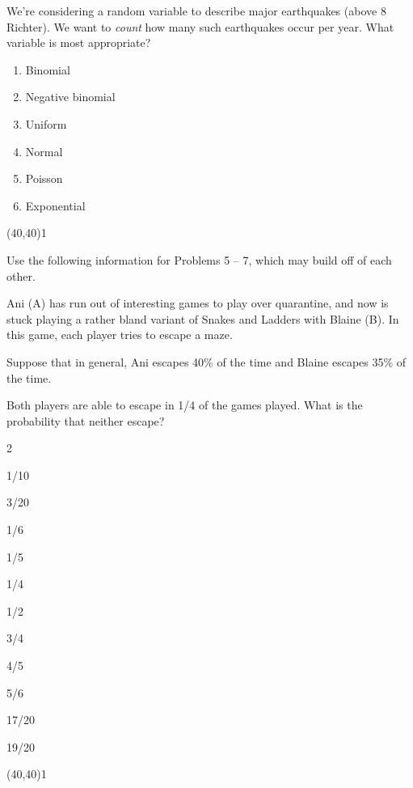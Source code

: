 \documentclass[addpoints]{exam}
\def\solutions{0}
\begin{document}
{\begin{questions}
\vspace{2mm}
\question[3] We're considering a random variable to describe major earthquakes (above 8 Richter).  We want to \textit{count} how many such earthquakes occur per year.  What variable is most appropriate?

\vspace{2mm}
\begin{minipage}[b]{.85\textwidth}
	\begin{enumerate}[label=\Alph*.]
		\item Binomial
		\item Negative binomial
		\item Uniform
		\item Normal
		\item Poisson
		\item Exponential
	\end{enumerate}
\end{minipage}
\begin{minipage}[b]{.1\textwidth}
	\vspace{\fill}\framebox(40,40){\if\solutions1 \fi}
\end{minipage}

\clearpage
\noindent Use the following information for Problems 5 -- 7, which may build off of each other.
\medskip

\noindent Ani (A) has run out of interesting games to play over quarantine, and now is stuck playing a rather bland variant of Snakes and Ladders with Blaine (B).  In this game, each player tries to escape a maze.
\vspace{1mm}

Suppose that in general, Ani escapes 40\% of the time and Blaine escapes 35\% of the time.

\question[3] Both players are able to escape in 1/4 of the games played.  What is the probability that neither escape?
\vspace{2mm}

\begin{minipage}[b]{.85\textwidth}
	\begin{enumerate}[label=\Alph*.]
	\end{enumerate}
\end{minipage}
\begin{minipage}[b]{.1\textwidth}
	\vspace{\fill}\framebox(40,40){\if\solutions1 \fi}
\end{minipage}


\end{questions}}
\end{document}

